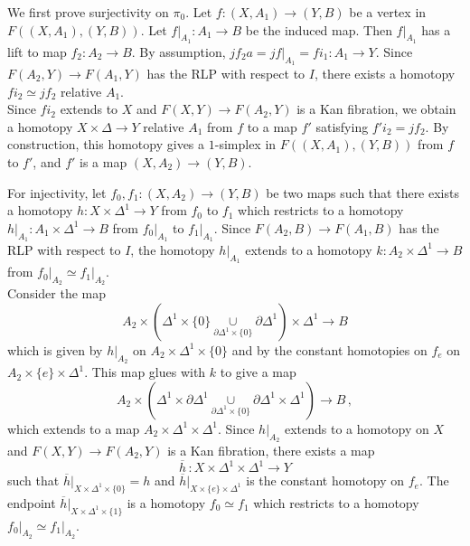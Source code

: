         We first prove surjectivity on $\pi_0$. Let $f \colon (X, A_1) \to (Y, B)$ be a vertex in $F((X, A_1),(Y, B))$. Let ${f|}_{A_1} \colon A_1 \to B$ be the induced map. Then ${f|}_{A_1}$ has a lift to map $f_2 \colon A_2 \to B$. By assumption, $j f_2 a = j {f|}_{A_1} = f i_1 \colon A_1 \to Y$. Since $F(A_2, Y) \to F(A_1, Y)$ has the RLP with respect to $I$, there exists a homotopy $f i_2 \simeq j f_2$ relative $A_1$.\\
        Since $f i_2$ extends to $X$ and $F(X, Y) \to F(A_2,Y)$ is a Kan fibration, we obtain a homotopy $X \times \Delta \to Y$ relative $A_1$ from $f$ to a map $f'$ satisfying $f' i_2 = j f_2$. By construction, this homotopy gives a $1$-simplex in $F((X, A_1),(Y, B))$ from $f$ to $f'$, and $f'$ is a map $(X, A_2) \to (Y, B)$.

        For injectivity, let $f_0, f_1 \colon (X, A_2) \to (Y, B)$ be two maps such that there exists a homotopy $h \colon X \times \Delta^1 \to Y$ from $f_0$ to $f_1$ which restricts to a homotopy ${h|}_{A_1} \colon A_1 \times \Delta^1 \to B$ from ${f_0|}_{A_1}$ to ${f_1|}_{A_1}$. Since $F(A_2, B) \to F(A_1, B)$ has the RLP with respect to $I$, the homotopy ${h|}_{A_1}$ extends to a homotopy $k \colon A_2 \times \Delta^1 \to B$ from ${f_0|}_{A_2} \simeq {f_1|}_{A_2}$.\\
        Consider the map
        \begin{equation*}
            A_2 \times (\Delta^1 \times \{0\} \underset{\partial \Delta^1 \times \{0\}}{\cup} \partial \Delta^1) \times \Delta^1 \to B
        \end{equation*}
        which is given by ${h|}_{A_2}$ on $A_2 \times \Delta^1 \times \{0\}$ and by the constant homotopies on $f_e$ on $A_2 \times \{e\} \times \Delta^1$. This map glues with $k$ to give a map
        \begin{equation*}
            A_2 \times (\Delta^1 \times \partial \Delta^1 \underset{\partial \Delta^1 \times \{0\}}{\cup} \partial \Delta^1 \times \Delta^1) \to B \,,
        \end{equation*}
        which extends to a map $A_2 \times \Delta^1 \times \Delta^1$. Since ${h|}_{A_2}$ extends to a homotopy on $X$ and $F(X, Y) \to F(A_2, Y)$ is a Kan fibration, there exists a map
        \begin{equation*}
            \overline{h} \,\colon X \times \Delta^1 \times \Delta^1 \to Y
        \end{equation*}
        such that ${\overline{h}|}_{X \times \Delta^1 \times \{0\}} = h$ and ${\overline{h}|}_{X \times \{e\} \times  \Delta^1}$ is the constant homotopy on $f_e$. The endpoint ${\overline{h}|}_{X \times \Delta^1 \times \{1\}}$ is a homotopy $f_0 \simeq f_1$ which restricts to a homotopy ${f_0|}_{A_2} \simeq {f_1|}_{A_2}$.

